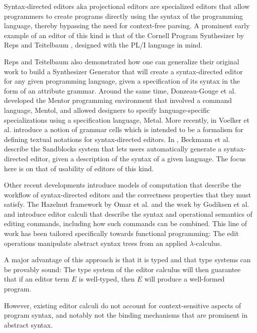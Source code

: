 \documentclass[sigplan,review]{acmart}
\begin{document}
Syntax-directed editors aka projectional editors are specialized
editors that allow programmers to create programs directly using the
syntax of the programming language, thereby bypassing the need for
context-free parsing. A prominent early example of an editor of this
kind is that of the Cornell Program Synthesizer by Reps and Teitelbaum
\cite{10.1145/358746.358755}, designed with the PL/I language in mind.

Reps and Teitelbaum also demonstrated \cite{10.1145/390010.808247} how
one can generalize their original work to build a Synthesizer
Generator that will create a syntax-directed editor for any given
programming language, given a specification of its syntax in the form
of an attribute grammar. Around the same time, Donzeau-Gouge et
al. developed the Mentor programming environment
\cite{10.5555/800054.801990} that involved a command language, Mentol,
and allowed designers to specify language-specific specializations
using a specification language, Metal. More recently, in
\cite{10.1145/2997364.2997365} Voelker et al. introduce a notion of
grammar cells which is intended to be a formalism for defining textual
notations for syntax-directed editors. In
\cite{10.1145/3544548.3580785}, Beckmann et al. describe the
Sandblocks system that lets users automatically generate a
syntax-directed editor, given a description of the syntax of a given
language. The focus here is on that of usability of editors of this
kind.

Other recent developments introduce models of computation that
describe the workflow of syntax-directed editors and the correctness
properties that they must satisfy. The Hazelnut framework by Omar et
al. \cite{hazelnut} and the work by Godiksen et al. and
\cite{type_safe_structure_editor} introduce editor calculi that
describe the syntax and operational semantics of editing commands,
including how such commands can be combined. This line of work has
been tailored specifically towards functional programming: The edit
operations manipulate abstract syntax trees from an applied
$\lambda$-calculus.

A major advantage of this approach is that it is typed and that type
systems can be provably sound: The type system of the editor calculus
will then guarantee that if an editor term $E$ is well-typed, then $E$
will produce a well-formed program.

However, existing editor calculi do not account for context-sensitive
aspects of program syntax, and notably not the binding 
mechanisms that are prominent in abstract syntax.
\end{document}
